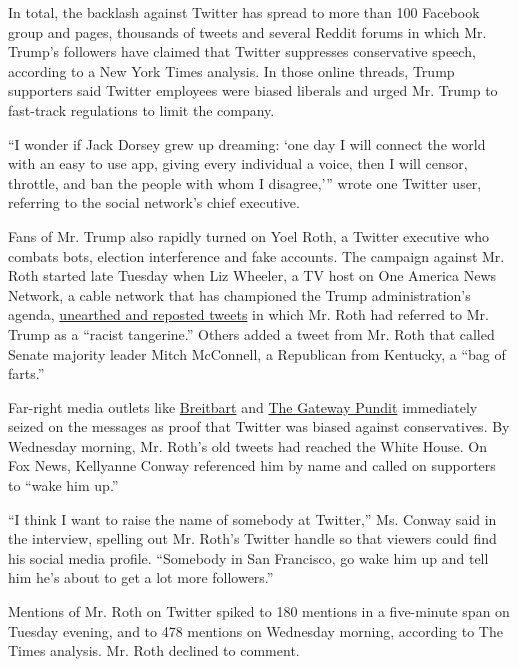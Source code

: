 In total, the backlash against Twitter has spread to more than 100
Facebook group and pages, thousands of tweets and several Reddit forums
in which Mr. Trump's followers have claimed that Twitter suppresses
conservative speech, according to a New York Times analysis. In those
online threads, Trump supporters said Twitter employees were biased
liberals and urged Mr. Trump to fast-track regulations to limit the
company.

``I wonder if Jack Dorsey grew up dreaming: `one day I will connect the
world with an easy to use app, giving every individual a voice, then I
will censor, throttle, and ban the people with whom I disagree,''' wrote
one Twitter user, referring to the social network's chief executive.

Fans of Mr. Trump also rapidly turned on Yoel Roth, a Twitter executive
who combats bots, election interference and fake accounts. The campaign
against Mr. Roth started late Tuesday when Liz Wheeler, a TV host on One
America News Network, a cable network that has championed the Trump
administration's agenda,
\href{https://twitter.com/Liz_Wheeler/status/1265463081997484032}{unearthed
and reposted tweets} in which Mr. Roth had referred to Mr. Trump as a
``racist tangerine.'' Others added a tweet from Mr. Roth that called
Senate majority leader Mitch McConnell, a Republican from Kentucky, a
``bag of farts.''

Far-right media outlets like
\href{https://www.breitbart.com/tech/2020/05/26/twitter-fact-checker-claimed-trump-actual-nazis-mocked-flyover-states/}{Breitbart}
and
\href{https://www.thegatewaypundit.com/2020/05/report-twitters-head-site-integrity-responsible-election-security-misinformation-says-nazis-white-house/}{The
Gateway Pundit} immediately seized on the messages as proof that Twitter
was biased against conservatives. By Wednesday morning, Mr. Roth's old
tweets had reached the White House. On Fox News, Kellyanne Conway
referenced him by name and called on supporters to ``wake him up.''

``I think I want to raise the name of somebody at Twitter,'' Ms. Conway
said in the interview, spelling out Mr. Roth's Twitter handle so that
viewers could find his social media profile. ``Somebody in San
Francisco, go wake him up and tell him he's about to get a lot more
followers.''

Mentions of Mr. Roth on Twitter spiked to 180 mentions in a five-minute
span on Tuesday evening, and to 478 mentions on Wednesday morning,
according to The Times analysis. Mr. Roth declined to comment.

